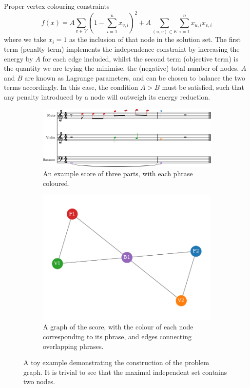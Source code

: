 \documentclass[12pt]{article}
\begin{document}
Proper vertex colouring constraints
\begin{equation}
    f(x)=A\sum_{v \in V}\left(1-\sum_{i=1}^{n} x_{v,i}\right)^2+A\sum_{(u,v) \in E}\sum_{i=1}^n x_{u,i}x_{v,i}
    \label{eq:MIS}
\end{equation}
where we take $x_i=1$ as the inclusion of that node in the solution set. The first term (penalty term) implements the independence constraint by increasing the energy by $A$ for each edge included, whilst the second term (objective term) is the quantity we are trying the minimise, the (negative) total number of nodes. $A$ and $B$ are known as Lagrange parameters, and can be chosen to balance the two terms accordingly. In this case, the condition $A>B$ must be satisfied, such that any penalty introduced by a node will outweigh its energy reduction.

\begin{figure}
    \begin{subfigure}[t]{0.5\linewidth}
        \includegraphics[width=0.95\linewidth]{../Figures/toy_trim-1.png}
        \caption{An example score of three parts, with each phrase coloured.}
        \label{fig:simple-excerpt}
    \end{subfigure}\hfill
    \begin{subfigure}[t]{0.5\linewidth}
        \includegraphics[width=0.95\linewidth]{../Figures/toy_graph.pdf}
        \caption{A graph of the score, with the colour of each node corresponding to its phrase, and edges connecting overlapping phrases.}
        \label{fig:simple-graph}
    \end{subfigure}
    \caption{A toy example demonstrating the construction of the problem graph. It is trivial to see that the maximal independent set contains two nodes.}
    \label{fig:toy}
\end{figure}
\end{document}
